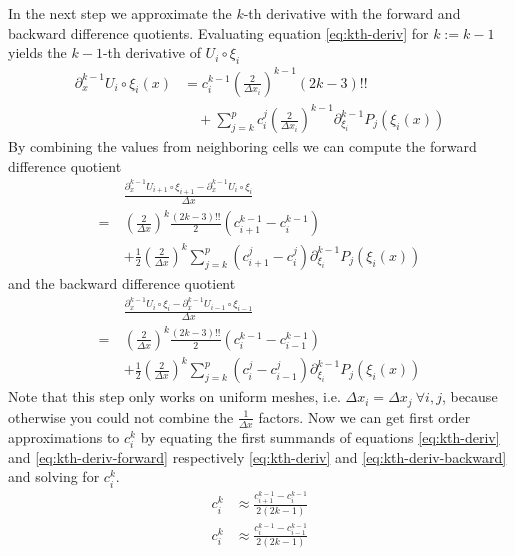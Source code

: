 In the next step we approximate the $k$-th derivative with the forward and backward difference quotients.
Evaluating equation \eqref{eq:kth-deriv} for $k := k - 1$ yields the $k - 1$-th derivative of $U_{i} \circ \xi_{i}$
\begin{align*}
  \partial_{x}^{k - 1} U_{i} \circ \xi_{i}(x) & = c_{i}^{k - 1} \left( \frac{2}{\Delta x_{i}} \right)^{k - 1} \left( 2k - 3 \right)!!\\
  & \quad + \sum_{j = k}^{p} c_{i}^{j} \left( \frac{2}{\Delta x_{i}} \right)^{k - 1} \partial_{\xi_{i}}^{k - 1} P_{j}(\xi_{i}(x))
\end{align*}
By combining the values from neighboring cells we can compute the forward difference quotient
\begin{align}
  & \frac{\partial_{x}^{k - 1} U_{i + 1} \circ \xi_{i + 1} - \partial_{x}^{k - 1} U_{i} \circ \xi_{i}}{\Delta x}\nonumber\\
  =~& \left( \frac{2}{\Delta x} \right)^{k} \frac{(2k - 3)!!}{2} (c_{i + 1}^{k - 1} - c_{i}^{k - 1})\nonumber\\
  & + \frac{1}{2} \left( \frac{2}{\Delta x} \right)^{k} \sum_{j = k}^{p} (c_{i + 1}^{j} - c_{i}^{j}) \partial_{\xi_{i}}^{k - 1} P_{j}(\xi_{i}(x)) \label{eq:kth-deriv-forward}
\end{align}
and the backward difference quotient
\begin{align}
  & \frac{\partial_{x}^{k - 1} U_{i} \circ \xi_{i} - \partial_{x}^{k - 1} U_{i - 1} \circ \xi_{i - 1}}{\Delta x}\nonumber\\
  =~& \left( \frac{2}{\Delta x} \right)^{k} \frac{(2k - 3)!!}{2} (c_{i}^{k - 1} - c_{i - 1}^{k - 1})\nonumber\\
  & + \frac{1}{2} \left( \frac{2}{\Delta x} \right)^{k} \sum_{j = k}^{p} (c_{i}^{j} - c_{i - 1}^{j}) \partial_{\xi_{i}}^{k - 1} P_{j}(\xi_{i}(x)) \label{eq:kth-deriv-backward}
\end{align}
Note that this step only works on uniform meshes, i.e. $\Delta x_{i} = \Delta x_{j}~\forall i, j$, because otherwise you could not combine the $\frac{1}{\Delta x}$ factors.
Now we can get first order approximations to $c_{i}^{k}$ by equating the first summands of equations \eqref{eq:kth-deriv} and \eqref{eq:kth-deriv-forward} respectively \eqref{eq:kth-deriv} and \eqref{eq:kth-deriv-backward} and solving for $c_{i}^{k}$.
\begin{align*}
  c_{i}^{k} & \approx \frac{c_{i + 1}^{k - 1} - c_{i}^{k - 1}}{2(2k - 1)}\\
  c_{i}^{k} & \approx \frac{c_{i}^{k - 1} - c_{i - 1}^{k - 1}}{2(2k - 1)}
\end{align*}
